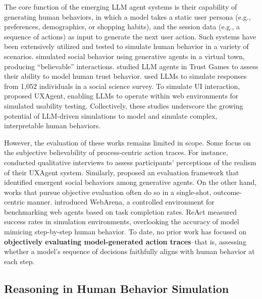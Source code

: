 \documentclass[11pt]{article}
\begin{document}
The core function of the emerging LLM agent systems is their capability of generating human behaviors, in which a model takes a static user persona (e.g., preferences, demographics, or shopping habits), and the session data (e.g., a sequence of actions) as input to generate the next user action.
Such systems have been extensively utilized and tested to simulate human behavior in a variety of scenarios.
\citet{parkGenerativeAgentsInteractive2023} simulated social behavior using generative agents in a virtual town, producing ``believable'' interactions.  
\citet{xieCanLargeLanguage2024} studied LLM agents in Trust Games to assess their ability to model human trust behavior.  
\citet{parkGenerativeAgentSimulations2024} used LLMs to simulate responses from 1,052 individuals in a social science survey.  
To simulate UI interaction, \citet{luUXAgentLLMAgentBased2025} proposed UX\-Agent, enabling LLMs to operate within web environments for simulated usability testing.
Collectively, these studies underscore the growing potential of LLM-driven simulations to model and simulate complex, interpretable human behaviors.


However, the evaluation of these works remains limited in scope. Some focus on the subjective believability of process-centric action traces. 
For instance, \citet{luUXAgentLLMAgentBased2025} conducted qualitative interviews to assess participants' perceptions of the realism of their UXAgent system.
Similarly, \citet{parkGenerativeAgentsInteractive2023} proposed an evaluation framework that identified emergent social behaviors among generative agents.
On the other hand, works that pursue objective evaluation often do so in a single-shot, outcome-centric manner.
\citet{zhouWebArenaRealisticWeb2024} introduced WebArena, a controlled environment for benchmarking web agents based on task completion rates. ReAct \cite{yaoReActSynergizingReasoning2023} measured success rates in simulation environments, overlooking the accuracy of model mimicing step-by-step human behavior.
To date, no prior work has focused on \textbf{objectively evaluating model-generated  action traces}--that is, assessing whether a model's sequence of decisions faithfully aligns with human behavior at each step.

\subsection{Reasoning in Human Behavior Simulation}  
\end{document}
